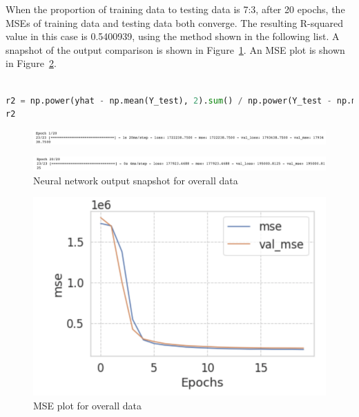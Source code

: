 \documentclass{scrartcl}
\begin{document}
\noindent When the proportion of training data to testing data is 7:3, after 20 epochs, the MSEs of training data and testing data both converge. The resulting R-squared value in this case is 0.5400939, using the method shown in the following list. A snapshot of the output comparison is shown in Figure~\ref{fig:NN7-8}. An MSE plot is shown in Figure~\ref{fig:NN6}. \\

\begin{lstlisting}[language=Python, caption= R-Squared output code, basicstyle=\tiny,captionpos=b]

r2 = np.power(yhat - np.mean(Y_test), 2).sum() / np.power(Y_test - np.mean(Y_test), 2).sum()
r2

\end{lstlisting}

\begin{figure}
         \centering
         \includegraphics[width=\textwidth]{Graphics/Neural Network Images/NN7.png}
\end{figure}
     
\begin{figure}
         \centering
         \includegraphics[width=\textwidth]{Graphics/Neural Network Images/NN8.png}
         \caption{Neural network output snapshot for overall data}
         \label{fig:NN7-8}
\end{figure}


\begin{figure}[H]
	\begin{center}
		\includegraphics[scale=1.0]{Graphics/Neural Network Images/NN6.png}
	\end{center}
	\caption{MSE plot for overall data}
	\label{fig:NN6}
\end{figure}
\end{document}
